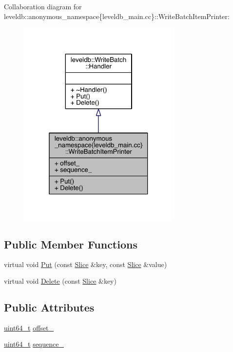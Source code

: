 Collaboration diagram for leveldb\+:\+:anonymous\+\_\+namespace\{leveldb\+\_\+main.\+cc\}\+:\+:Write\+Batch\+Item\+Printer\+:
\nopagebreak
\begin{figure}[H]
\begin{center}
\leavevmode
\includegraphics[width=232pt]{classleveldb_1_1anonymous__namespace_02leveldb__main_8cc_03_1_1_write_batch_item_printer__coll__graph}
\end{center}
\end{figure}
\subsection*{Public Member Functions}
\begin{DoxyCompactItemize}
\item 
virtual void \hyperlink{classleveldb_1_1anonymous__namespace_02leveldb__main_8cc_03_1_1_write_batch_item_printer_ac5b17dff7e9ca540a76711d682ea1661}{Put} (const \hyperlink{classleveldb_1_1_slice}{Slice} \&key, const \hyperlink{classleveldb_1_1_slice}{Slice} \&value)
\item 
virtual void \hyperlink{classleveldb_1_1anonymous__namespace_02leveldb__main_8cc_03_1_1_write_batch_item_printer_a472105c2eeab08fdc7b0d371db066a23}{Delete} (const \hyperlink{classleveldb_1_1_slice}{Slice} \&key)
\end{DoxyCompactItemize}
\subsection*{Public Attributes}
\begin{DoxyCompactItemize}
\item 
\hyperlink{stdint_8h_aaa5d1cd013383c889537491c3cfd9aad}{uint64\+\_\+t} \hyperlink{classleveldb_1_1anonymous__namespace_02leveldb__main_8cc_03_1_1_write_batch_item_printer_af9453d5aa13b28e83ce7a2b9e5537469}{offset\+\_\+}
\item 
\hyperlink{stdint_8h_aaa5d1cd013383c889537491c3cfd9aad}{uint64\+\_\+t} \hyperlink{classleveldb_1_1anonymous__namespace_02leveldb__main_8cc_03_1_1_write_batch_item_printer_ac9f202808769c048c257f14f400e32d7}{sequence\+\_\+}
\end{DoxyCompactItemize}


